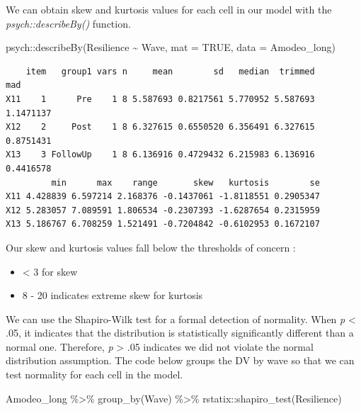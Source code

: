 \documentclass[
  11pt,
]{book}
\newenvironment{Shaded}{\begin{snugshade}}{\end{snugshade}}
\newcommand{\AttributeTok}[1]{\textcolor[rgb]{0.77,0.63,0.00}{#1}}
\newcommand{\ConstantTok}[1]{\textcolor[rgb]{0.00,0.00,0.00}{#1}}
\newcommand{\FunctionTok}[1]{\textcolor[rgb]{0.00,0.00,0.00}{#1}}
\newcommand{\NormalTok}[1]{#1}
\newcommand{\SpecialCharTok}[1]{\textcolor[rgb]{0.00,0.00,0.00}{#1}}
\providecommand{\tightlist}{%
  \setlength{\itemsep}{0pt}\setlength{\parskip}{0pt}}
\begin{document}
We can obtain skew and kurtosis values for each cell in our model with the \emph{psych::describeBy()} function.

\begin{Shaded}
\begin{Highlighting}[]
\NormalTok{psych}\SpecialCharTok{::}\FunctionTok{describeBy}\NormalTok{(Resilience }\SpecialCharTok{\textasciitilde{}}\NormalTok{ Wave, }\AttributeTok{mat =} \ConstantTok{TRUE}\NormalTok{, }\AttributeTok{data =}\NormalTok{ Amodeo\_long)}
\end{Highlighting}
\end{Shaded}

\begin{verbatim}
    item   group1 vars n     mean        sd   median  trimmed       mad
X11    1      Pre    1 8 5.587693 0.8217561 5.770952 5.587693 1.1471137
X12    2     Post    1 8 6.327615 0.6550520 6.356491 6.327615 0.8751431
X13    3 FollowUp    1 8 6.136916 0.4729432 6.215983 6.136916 0.4416578
         min      max    range       skew   kurtosis        se
X11 4.428839 6.597214 2.168376 -0.1437061 -1.8118551 0.2905347
X12 5.283057 7.089591 1.806534 -0.2307393 -1.6287654 0.2315959
X13 5.186767 6.708259 1.521491 -0.7204842 -0.6102953 0.1672107
\end{verbatim}

Our skew and kurtosis values fall below the thresholds of concern \citep{kline_principles_2016}:

\begin{itemize}
\tightlist
\item
  \textless{} 3 for skew
\item
  8 - 20 indicates extreme skew for kurtosis
\end{itemize}

We can use the Shapiro-Wilk test for a formal detection of normality. When \emph{p} \textless{} .05, it indicates that the distribution is statistically significantly different than a normal one. Therefore, \emph{p} \textgreater{} .05 indicates we did not violate the normal distribution assumption. The code below groups the DV by wave so that we can test normality for each cell in the model.

\begin{Shaded}
\begin{Highlighting}[]
\NormalTok{Amodeo\_long }\SpecialCharTok{\%\textgreater{}\%}
  \FunctionTok{group\_by}\NormalTok{(Wave) }\SpecialCharTok{\%\textgreater{}\%}
\NormalTok{  rstatix}\SpecialCharTok{::}\FunctionTok{shapiro\_test}\NormalTok{(Resilience)}
\end{Highlighting}
\end{Shaded}
\end{document}
